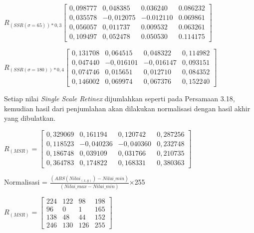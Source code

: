 \noindent
$R_{(SSR(\sigma=65))*0,3}\left[
\begin{matrix}
0,098777&	0,048385&	0.036240&	0.086232\\
0,035578&	-0,012075&	-0.012110&	0.069861\\
0,056057&	0,011737&	0.009532&	0.063261\\
0,109497&	0,052478&	0.050530&	0.114175
\end{matrix}
\right]$

\noindent
$R_{(SSR(\sigma=180))*0,4}\left[
\begin{matrix}
0,131708&	0,064515&	0,048322&	0,114982\\
0,047440&	-0,016101&	-0,016147&	0,093151\\
0,074746&	0,015651&	0,012710&	0,084352\\
0,146002&	0,069974&	0,067376&	0,152240
\end{matrix}
\right]$

\noindent Setiap nilai \emph{Single Scale Retinex} dijumlahkan seperti pada Persamaan 3.18, kemudian hasil dari penjumlahan akan dilakukan normalisasi dengan hasil akhir yang dibulatkan.

\noindent
$R_{(MSR)}=\left[
\begin{matrix}
0,329069&	0,161194&	0,120742&	0,287256\\
0,118523&	-0,040236&	-0,040360&	0,232748\\
0,186748&	0,039109&	0,031766&	0,210735\\
0,364783&	0,174822&	0,168331&	0,380363
\end{matrix}
\right]$

\noindent Normalisasi = $\frac{(ABS(Nilai_{(x,y)})-Nilai\_min)}{(Nilai\_max-Nilai\_min)}$$\times$255

\noindent
$R_{(MSR)}=\left[
\begin{matrix}
224&	122&	98&		198\\
96&		0&		1&		165\\
138&	48&		44&		152\\
246&	130&	126&	255

\end{matrix}
\right]$\\

